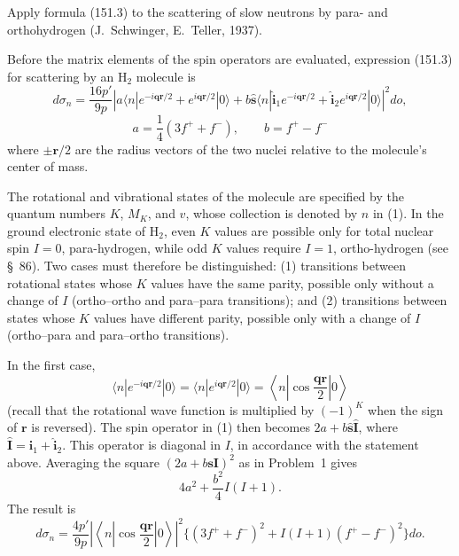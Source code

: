  Apply formula (151.3) to the scattering of slow neutrons by para- and orthohydrogen (J.~Schwinger, E.~Teller, 1937).

\SolutionHeading Before the matrix elements of the spin operators are evaluated, expression (151.3) for scattering by an $\mathrm H_2$ molecule is
\begin{equation}
 d\sigma_n=\frac{16p'}{9p}\left|a\langle n|e^{-i\mathbf q\mathbf r/2}+e^{i\mathbf q\mathbf r/2}|0\rangle
 +b\hat{\mathbf s}\langle n|\hat{\mathbf i}_1e^{-i\mathbf q\mathbf r/2}+\hat{\mathbf i}_2e^{i\mathbf q\mathbf r/2}|0\rangle\right|^2do,
 \tag{1}
\end{equation}
\[
 a=\frac14(3f^++f^-),\qquad b=f^+-f^-
\]
where $\pm\mathbf r/2$ are the radius vectors of the two nuclei relative to the molecule's center of mass.

The rotational and vibrational states of the molecule are specified by the quantum numbers $K$, $M_K$, and $v$, whose collection is denoted by $n$ in (1). In the ground electronic state of $\mathrm H_2$, even $K$ values are possible only for total nuclear spin $I=0$, para-hydrogen, while odd $K$ values require $I=1$, ortho-hydrogen (see §~86). Two cases must therefore be distinguished: (1) transitions between rotational states whose $K$ values have the same parity, possible only without a change of $I$ (ortho--ortho and para--para transitions); and (2) transitions between states whose $K$ values have different parity, possible only with a change of $I$ (ortho--para and para--ortho transitions).

In the first case,
\[
 \langle n|e^{-i\mathbf q\mathbf r/2}|0\rangle
 =\langle n|e^{i\mathbf q\mathbf r/2}|0\rangle
 =\left\langle n\left|\cos\frac{\mathbf q\mathbf r}{2}\right|0\right\rangle
\]
(recall that the rotational wave function is multiplied by $(-1)^K$ when the sign of $\mathbf r$ is reversed). The spin operator in (1) then becomes $2a+b\hat{\mathbf s}\hat{\mathbf I}$, where $\hat{\mathbf I}=\hat{\mathbf i}_1+\hat{\mathbf i}_2$. This operator is diagonal in $I$, in accordance with the statement above. Averaging the square $(2a+b\mathbf s\mathbf I)^2$ as in Problem~1 gives
\[
 4a^2+\frac{b^2}{4}I(I+1).
\]
The result is
\begin{equation}
 d\sigma_n=\frac{4p'}{9p}\left|\left\langle n\left|\cos\frac{\mathbf q\mathbf r}{2}\right|0\right\rangle\right|^2
 \big\{(3f^++f^-)^2+I(I+1)(f^+-f^-)^2\big\}do.
 \tag{2}
\end{equation}

